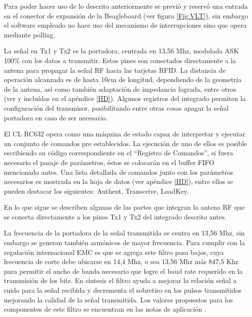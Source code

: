 Para poder hacer uso de lo descrito anteriormente se previó y reservó una entrada en el conector de expansión de la Beagleboard (ver figura \ref{Fig:VLT}), sin embargo el software empleado no hace uso del mecanismo de interrupciones sino que opera mediante polling.

\bigskip
{}

La señal en Tx1 y Tx2 es la portadora, centrada en 13,56 Mhz, modulada ASK 100\% con los datos a transmitir. Estos pines son conectados directamente a la antena para propagar la señal RF hacia las tarjetas RFID. La distancia de operación alcanzada es de hasta 10cm de longitud, dependiendo de la geometría de la antena, así como también adaptación de impedancia lograda, entre otros (ver \cite{MRICF} y \cite{RFIDPA} incluídas en el apéndice \ref{HD}).
Algunos registros del integrado permiten la configuración del transmisor, posibilitando entre otras cosas apagar la señal portadora en caso de ser necesario.

\bigskip
{}

El CL RC632 opera como una máquina de estado capaz de interpretar y ejecutar un conjunto de comandos pre establecidos. La ejecución de uno de ellos es posible escribiendo su código correspondiente en el “Registro de Comandos”, si fuera necesario el pasaje de parámetros, éstos se colocarán en el buffer FIFO mencionado antes. 
Una lista detallada de comandos junto con los parámetros necesarios es mostrada en la hoja de datos (ver apéndice \ref{HD}), entre ellos se pueden destacar los siguientes: Authent, Transceive, LoadKey.

\bigskip
{}

En lo que sigue se describen algunas de las partes que integran la antena RF que se conecta directamente a los pines Tx1 y Tx2 del integrado descrito antes.

\bigskip
{}

La frecuencia de la portadora de la señal transmitida se centra en 13,56 Mhz, sin embargo se generan también armónicos de mayor frecuencia. Para cumplir con la regulación internacional EMC es que se agrega este filtro pasa bajos, cuya frecuencia de corte debe ubicarse en 14,4 Mhz, o sea 13,56 Mhz más 847,5 Khz para permitir el ancho de banda necesario que logre el baud rate requerido en la transmisión de los bits. 
En síntesis el filtro ayuda a mejorar la relación señal a ruido para la señal recibida y decrementa el sobretiro en los pulsos transmitidos mejorando la calidad de la señal transmitida.
Los valores propuestos para los componentes de este filtro se encuentran en las notas de aplicación \cite{MRICF}.

